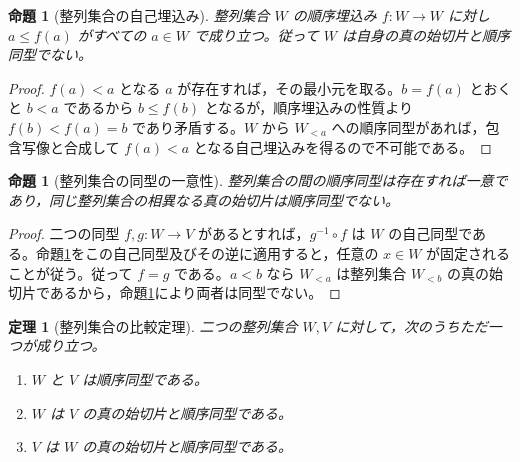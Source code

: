 \documentclass[a5paper,10pt,dvipdfmx]{jsarticle}
\theoremstyle{definition}
\theoremstyle{plain}
\newtheorem{prop}[ruledef]{命題}
\newtheorem{thm}[ruledef]{定理}
\begin{document}
\begin{prop}[整列集合の自己埋込み]\label{k125}
整列集合 $W$ の順序埋込み $f\colon W\to W$ に対し $a\leq f(a)$ がすべての $a\in W$ で成り立つ。従って $W$ は自身の真の始切片と順序同型でない。
\end{prop}
\begin{proof}
$f(a)<a$ となる $a$ が存在すれば，その最小元を取る。$b=f(a)$ とおくと $b<a$ であるから $b\leq f(b)$ となるが，順序埋込みの性質より $f(b)<f(a)=b$ であり矛盾する。$W$ から $W_{<a}$ への順序同型があれば，包含写像と合成して $f(a)<a$ となる自己埋込みを得るので不可能である。
\end{proof}
\begin{prop}[整列集合の同型の一意性]\label{k126}
整列集合の間の順序同型は存在すれば一意であり，同じ整列集合の相異なる真の始切片は順序同型でない。
\end{prop}
\begin{proof}
二つの同型 $f,g\colon W\to V$ があるとすれば，$g^{-1}\circ f$ は $W$ の自己同型である。命題\ref{k125}をこの自己同型及びその逆に適用すると，任意の $x\in W$ が固定されることが従う。従って $f=g$ である。$a<b$ なら $W_{<a}$ は整列集合 $W_{<b}$ の真の始切片であるから，命題\ref{k125}により両者は同型でない。
\end{proof}
\begin{thm}[整列集合の比較定理]\label{k127}
二つの整列集合 $W,V$ に対して，次のうちただ一つが成り立つ。
\begin{enumerate}
\item $W$ と $V$ は順序同型である。
\item $W$ は $V$ の真の始切片と順序同型である。
\item $V$ は $W$ の真の始切片と順序同型である。
\end{enumerate}
\end{thm}
\end{document}
